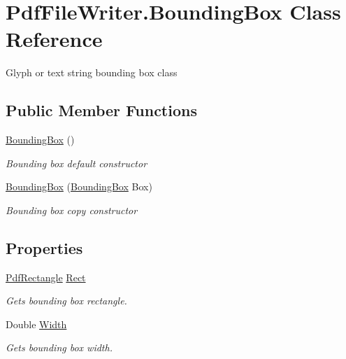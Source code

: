 \hypertarget{class_pdf_file_writer_1_1_bounding_box}{}\section{Pdf\+File\+Writer.\+Bounding\+Box Class Reference}
\label{class_pdf_file_writer_1_1_bounding_box}


Glyph or text string bounding box class  


\subsection*{Public Member Functions}
\begin{DoxyCompactItemize}
\item 
\hyperlink{class_pdf_file_writer_1_1_bounding_box_a482d46131fa64dc6bf7f518e2c20756f}{Bounding\+Box} ()
\begin{DoxyCompactList}\small\item\em Bounding box default constructor \end{DoxyCompactList}\item 
\hyperlink{class_pdf_file_writer_1_1_bounding_box_a9b24092831ad4ffa6b47540c4c56db90}{Bounding\+Box} (\hyperlink{class_pdf_file_writer_1_1_bounding_box}{Bounding\+Box} Box)
\begin{DoxyCompactList}\small\item\em Bounding box copy constructor \end{DoxyCompactList}\end{DoxyCompactItemize}
\subsection*{Properties}
\begin{DoxyCompactItemize}
\item 
\hyperlink{class_pdf_file_writer_1_1_pdf_rectangle}{Pdf\+Rectangle} \hyperlink{class_pdf_file_writer_1_1_bounding_box_a036208c82679b4fcefec138fb38fab87}{Rect}
\begin{DoxyCompactList}\small\item\em Gets bounding box rectangle. \end{DoxyCompactList}\item 
Double \hyperlink{class_pdf_file_writer_1_1_bounding_box_a7443efb71fa3975c1b106b32b48db4c7}{Width}
\begin{DoxyCompactList}\small\item\em Gets bounding box width. \end{DoxyCompactList}\end{DoxyCompactItemize}


